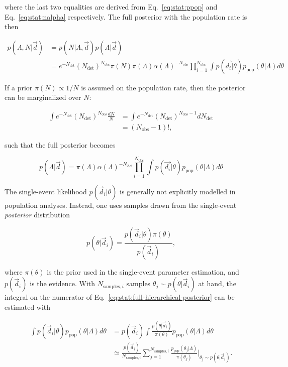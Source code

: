 \documentclass[%
preprint,
nofootinbib,
 amsmath,amssymb,
 aps,
]{revtex4-2}
\newcommand{\given}[2]{p( #1 | #2 )}
\newcommand{\ppop}[0]{p_{\text{pop}}}
\newcommand{\ndet}[0]{N_{\text{det}}}
\newcommand{\nobs}[0]{N_{\text{obs}}}
\begin{document}
where the last two equalities are derived from Eq.~\eqref{eq:stat:ppop} and
Eq.~\eqref{eq:stat:nalpha} respectively. The full posterior with the population rate is then

\begin{align}
	\nonumber
	\given{\Lambda, N }{\vec{d}} & = \given{N}{\Lambda, \vec{d}}\given{\Lambda}{\vec{d}}                    \\
	                             & = e^{-\ndet}(\ndet)^{\nobs} \pi(N) \pi(\Lambda) \alpha(\Lambda)^{-\nobs}
	\prod_{i=1}^{\nobs} \int \given{\vec{d_i}}{\theta} \ppop(\theta | \Lambda ) d\theta
\end{align}

If a prior $\pi(N) \propto 1/N$ is assumed on the population rate, then the posterior can be
marginalized over $N$:

\begin{align}
	\int e^{-\ndet}(\ndet)^{\nobs} \frac{dN}{N} & = \int e^{-\ndet}(\ndet)^{\nobs - 1} d\ndet \\
	                                            & = (\nobs - 1)!,
\end{align}

such that the full posterior becomes

\begin{equation}
	\label{eq:stat:full-hierarchical-posterior}
	\given{\Lambda}{\vec{d}} = \pi(\Lambda) \alpha(\Lambda)^{-\nobs}
	\prod_{i=1}^{\nobs} \int \given{\vec{d_i}}{\theta} \ppop(\theta | \Lambda ) d\theta
\end{equation}

The single-event likelihood $\given{\vec{d}_i}{\theta}$ is generally not explicitly modelled in
population analyses. Instead, one uses samples drawn from the single-event \textit{posterior}
distribution

\begin{equation}
	\given{\theta}{\vec{d}_i} = \frac{\given{\vec{d}_i}{\theta} \pi(\theta)}{p(\vec{d}_i)},
\end{equation}

where $\pi(\theta)$ is the prior used in the single-event parameter estimation, and $p(\vec{d}_i)$
is the evidence. With $N_{\text{samples},i}$ samples $\theta_j \sim \given{\theta}{\vec{d}_i}$ at
hand, the integral on the numerator of Eq.~\eqref{eq:stat:full-hierarchical-posterior} can be
estimated with

\begin{align}
	\int \given{\vec{d}_i}{\theta} \ppop(\theta | \Lambda ) d\theta & = p(\vec{d}_i)\int \frac{\given{\theta}{\vec{d}_i}}{\pi(\theta)} \ppop(\theta | \Lambda ) d\theta                                                                                     \\
	\label{eq:stat:posterior-monte-carlo-sum}
	                                                                & \simeq \frac{p(\vec{d}_i)}{N_{\text{samples},i}} \sum_{j=1}^{N_{\text{samples},i}} \frac{\ppop(\theta_j | \Lambda )}{\pi(\theta_j)} \Big |_{\theta_j \sim \given{\theta}{\vec{d}_i}}.
\end{align}
\end{document}
